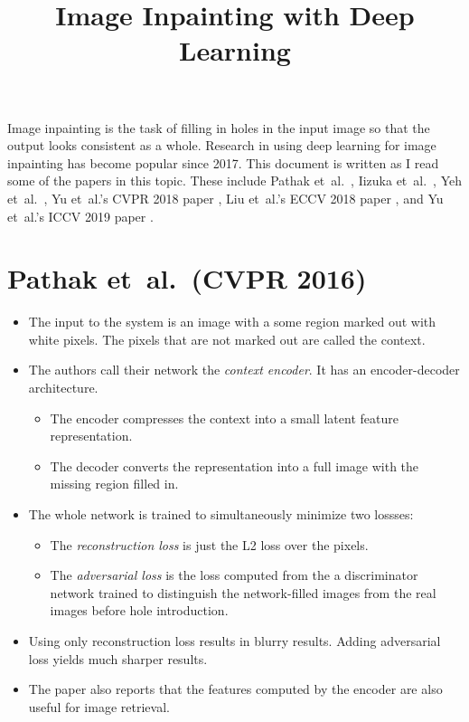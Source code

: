 \documentclass[10pt]{article}
\title{Image Inpainting with Deep Learning}
\newcommand{\etal}{{et~al.}}
\begin{document}
  \maketitle

  Image inpainting is the task of filling in holes in the input image so that the output looks consistent as a whole. Research in using deep learning for image inpainting has become popular since 2017. This document is written as I read some of the papers in this topic. These include Pathak \etal~\cite{Pathak:2016}, Iizuka \etal~\cite{Iizuka:2017}, Yeh \etal~\cite{Yeh:2017}, Yu \etal's CVPR 2018 paper \cite{Yu:2018}, Liu \etal's ECCV 2018 paper \cite{Liu:2018}, and Yu \etal's ICCV 2019 paper \cite{Yu:2019}.

  \section{Pathak \etal~(CVPR 2016)}

  \begin{itemize}
  	\item The input to the system is an image with a some region marked out with white pixels. The pixels that are not marked out are called the context.

  	\item The authors call their network the \emph{context encoder}. It has an encoder-decoder architecture.
  	\begin{itemize}
  		\item The encoder compresses the context into a small latent feature representation.

  		\item The decoder converts the representation into a full image with the missing region filled in.
  	\end{itemize}

  	\item The whole network is trained to simultaneously minimize two lossses:
  	\begin{itemize}
  		\item The \emph{reconstruction loss} is just the L2 loss over the pixels.
  		\item The \emph{adversarial loss} is the loss computed from the a discriminator network trained to distinguish the network-filled images from the real images before hole introduction.
  	\end{itemize}

  	\item Using only reconstruction loss results in blurry results. Adding adversarial loss yields much sharper results.

  	\item The paper also reports that the features computed by the encoder are also useful for image retrieval.  
  \end{itemize}
\end{document}
